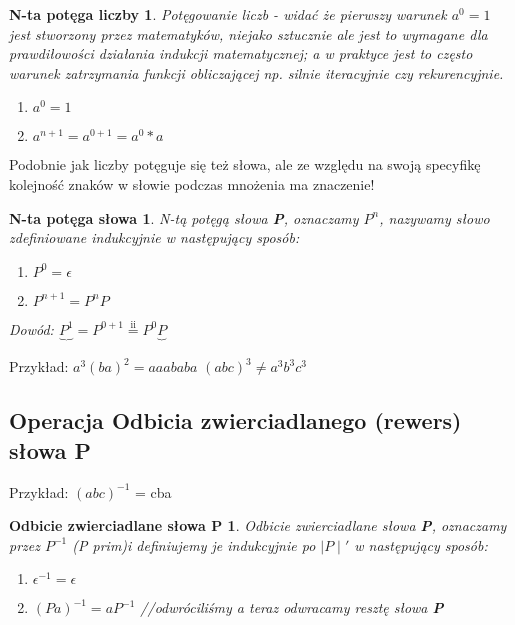 \newtheorem*{theorem15*}{N-ta potęga liczby}
\begin{theorem15*}
	Potęgowanie liczb - widać że pierwszy warunek $a^{0} = 1$ jest stworzony przez
	 matematyków, niejako sztucznie ale jest to wymagane dla prawdiłowości działania
	 indukcji matematycznej; a w praktyce jest to często warunek zatrzymania funkcji
	 obliczającej np. silnie iteracyjnie czy rekurencyjnie.

	\begin{enumerate}[label=(\roman*)]
		\item $a^{0} = 1$
		
		\item $a^{n+1} = a^{0+1}=a^{0}*a$
	\end{enumerate} 
\end{theorem15*}


Podobnie jak liczby potęguje się też słowa, ale ze względu na swoją specyfikę kolejność znaków w słowie podczas mnożenia ma znaczenie!

\newtheorem*{theorem16*}{N-ta potęga słowa}
\begin{theorem16*}
	N-tą potęgą słowa \textbf{P}, oznaczamy \textbf{$P^{n}$}, nazywamy słowo 
	zdefiniowane indukcyjnie w następujący sposób:

	\begin{enumerate}[label=(\roman*)]
		\item $P^{0} = \epsilon$
		\item $P^{n+1} = P^{n}P$
	\end{enumerate} 

Dowód:
$\underbrace{P^{1}}_{}= P^{0+1} \overset{\mathrm{ii}}{=}  P^{0}\underbrace{P}$

\end{theorem16*}

Przykład:\newline
{\color{red} $a^{3}(ba)^{2}= aaababa$ } \newline
{\color{red} $(abc)^{3} \neq a^{3}b^{3}c^{3}$}



\subsection{Operacja Odbicia zwierciadlanego (rewers) słowa P}
Przykład: \newline
$(abc)^{-1}$ = cba

\newtheorem*{theorem17*}{Odbicie zwierciadlane słowa P}
\begin{theorem17*}
Odbicie zwierciadlane słowa \textbf{P}, oznaczamy przez $P^{-1}$ (P prim)i definiujemy je indukcyjnie po $\mid P \mid '$ w następujący sposób:

	\begin{enumerate}[label=(\roman*)]
		\item $\epsilon^{-1} = \epsilon$
		\item $(Pa)^{-1} = aP^{-1}$  //odwróciliśmy a teraz odwracamy resztę słowa 			
				\textbf{P}
	\end{enumerate} 

\end{theorem17*}


